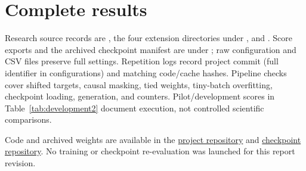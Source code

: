 \documentclass[10pt,twocolumn,letterpaper]{article}
\begin{document}
\newpage
\appendix
\section{Complete results}





Research source records are , the four extension directories
under , and . Score exports and the archived
checkpoint manifest are under ; raw configuration and
CSV files preserve full settings. Repetition logs record project commit
 (full identifier in configurations) and matching code/cache hashes.
Pipeline checks cover shifted targets, causal masking, tied weights, tiny-batch
overfitting, checkpoint loading, generation, and counters. Pilot/development
scores in Table~\ref{tab:development2} document execution, not controlled
scientific comparisons.

Code and archived weights are available in the
\href{https://github.com/KeremOzemre/Optimization-for-Large-Scale-Data}{project repository}
and \href{https://huggingface.co/dsa4212-tinystories/tinystories-nanogpt}{checkpoint repository}.
No training or checkpoint re-evaluation was launched for this report revision.
\end{document}
